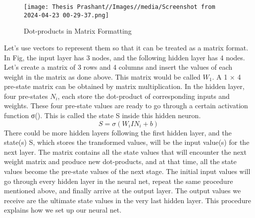 \begin{figure}
    \centering
    \texttt{[image: Thesis Prashant//Images//media/Screenshot from 2024-04-23 00-29-37.png]}
    \caption{Dot-products in Matrix Formatting}
    \label{fig:enter-label}
\end{figure}


Let's use vectors to represent them so that it can be treated as a matrix format. In Fig, the input layer has 3 nodes, and the following hidden layer has 4 nodes. Let's create a matrix of 3 rows and 4 columns and insert the values of each weight in the matrix as done above. This matrix would be called $W_{1}$. A 1 × 4 pre-state matrix can be obtained by matrix multiplication. In the hidden layer, four pre-states $N_{i}$, each store the dot-product of corresponding inputs and weights. These four pre-state values are ready to go through a certain activation function σ(). This is called the state S inside this hidden neuron.$$ S = \sigma(W_{i}IN_{i} +b)$$
There could be more hidden layers following the first hidden layer, and the state(s) S, which stores the transformed values, will be the input value(s) for the next layer. The matrix contains all the state values that will encounter the next weight matrix and produce new dot-products, and at that time, all the state values become the pre-state values of the next stage. The initial input values will go through every hidden layer in the neural net, repeat the same procedure mentioned above, and finally arrive at the output layer. The output values we receive are the ultimate state values in the very last hidden layer. This procedure explains how we set up our neural net.


